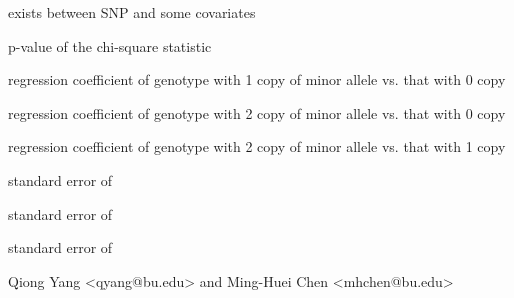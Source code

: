 \begin{Value}
\begin{ldescription}
exists between SNP and some covariates
\item[\code{pval }] p-value of the chi-square statistic
\item[\code{  }] 
\item[\code{beta10 }] regression coefficient of genotype with 1 copy of minor allele vs. that with 0 copy
\item[\code{beta20 }] regression coefficient of genotype with 2 copy of minor allele vs. that with 0 copy
\item[\code{beta21 }] regression coefficient of genotype with 2 copy of minor allele vs. that with 1 copy
\item[\code{se10 }] standard error of 
\item[\code{se20 }] standard error of 
\item[\code{se21 }] standard error of 
\end{ldescription}
\end{Value}
\begin{Author}\relax
Qiong Yang <qyang@bu.edu> and Ming-Huei Chen <mhchen@bu.edu>
\end{Author}

